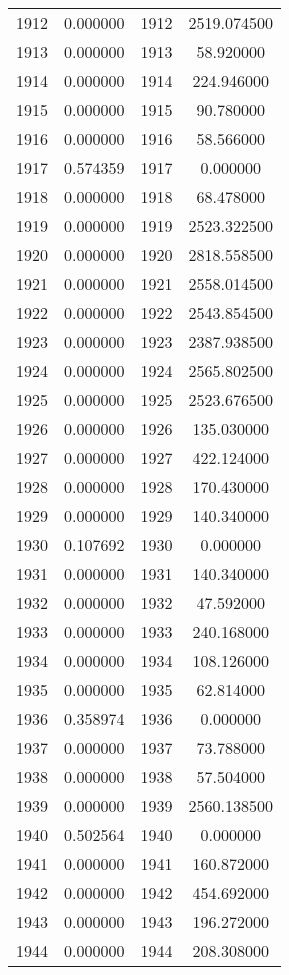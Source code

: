 \documentclass[12pt]{article}
\begin{document}
\begin{longtable}{@{}cccc@{}}
1912 & 0.000000 & 1912 & 2519.074500 \\
1913 & 0.000000 & 1913 & 58.920000 \\
1914 & 0.000000 & 1914 & 224.946000 \\
1915 & 0.000000 & 1915 & 90.780000 \\
1916 & 0.000000 & 1916 & 58.566000 \\
1917 & 0.574359 & 1917 & 0.000000 \\
1918 & 0.000000 & 1918 & 68.478000 \\
1919 & 0.000000 & 1919 & 2523.322500 \\
1920 & 0.000000 & 1920 & 2818.558500 \\
1921 & 0.000000 & 1921 & 2558.014500 \\
1922 & 0.000000 & 1922 & 2543.854500 \\
1923 & 0.000000 & 1923 & 2387.938500 \\
1924 & 0.000000 & 1924 & 2565.802500 \\
1925 & 0.000000 & 1925 & 2523.676500 \\
1926 & 0.000000 & 1926 & 135.030000 \\
1927 & 0.000000 & 1927 & 422.124000 \\
1928 & 0.000000 & 1928 & 170.430000 \\
1929 & 0.000000 & 1929 & 140.340000 \\
1930 & 0.107692 & 1930 & 0.000000 \\
1931 & 0.000000 & 1931 & 140.340000 \\
1932 & 0.000000 & 1932 & 47.592000 \\
1933 & 0.000000 & 1933 & 240.168000 \\
1934 & 0.000000 & 1934 & 108.126000 \\
1935 & 0.000000 & 1935 & 62.814000 \\
1936 & 0.358974 & 1936 & 0.000000 \\
1937 & 0.000000 & 1937 & 73.788000 \\
1938 & 0.000000 & 1938 & 57.504000 \\
1939 & 0.000000 & 1939 & 2560.138500 \\
1940 & 0.502564 & 1940 & 0.000000 \\
1941 & 0.000000 & 1941 & 160.872000 \\
1942 & 0.000000 & 1942 & 454.692000 \\
1943 & 0.000000 & 1943 & 196.272000 \\
1944 & 0.000000 & 1944 & 208.308000 \\

\end{longtable}
\end{document}
